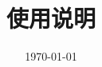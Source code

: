 \documentclass[
class = book,
zihao = -4,
font = noto,
paper = a4paper,
openany
]{easybook}
\begin{document}
	\title{\Name\ \Version \\ 使用说明}
	\date{\today}
	
	\frontmatter[roman]
	\maketitle
	\tableofcontents
	
	\mainmatter*
	
	
	
	
	
	
	
	
	\newpage
	
	\backmatter
\end{document}
